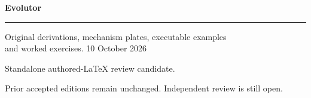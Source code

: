 \documentclass[11pt,oneside,openany]{book}
\begin{document}
\frontmatter
\begin{titlepage}
\color{Blue}\sffamily\vspace*{20mm}
{\Huge\bfseries Evolutor\par}
\vspace{10mm}{\LARGE Chapter 31\par}
\vspace{8mm}{\Large DOGMA state construction and execution\par}
\vspace{12mm}\rule{\linewidth}{.8pt}
\vspace{6mm}\par Original derivations, mechanism plates, executable examples\\and worked exercises.
\vfill 10 October 2026\par
Standalone authored-LaTeX review candidate.\par
Prior accepted editions remain unchanged. Independent review is still open.
\end{titlepage}
\tableofcontents
\mainmatter
\setcounter{chapter}{30}

\renewcommand{\bibname}{Sources and references}

\backmatter
\clearpage{}
\printindex
\end{document}
